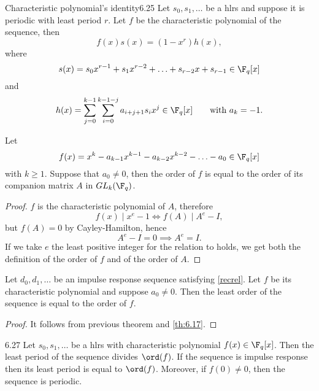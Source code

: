 \begin{teor}{Characteristic polynomial's identity}{6.25}
	Let \(s_0,s_1,\ldots\) be a hlrs and suppose it is periodic with least period \(r\). Let \(f\) be the characteristic polynomial of the sequence, then
	\[
		f(x)s(x) = (1-x^r)h(x),
	\]
	where
	\[
		s(x) = s_0x^{r-1}+s_1x^{r-2}+\ldots+s_{r-2}x+s_{r-1}\in\F_q[x]
	\]
	and
	\[
		h(x) = \sum_{j=0}^{k-1}\sum_{i=0}^{k-1-j}a_{i+j+1}s_i x^j \in \F_q[x] \qquad\text{with }a_k=-1.
	\]
\end{teor}
%
%
\begin{lem}
	Let
	\[
		f(x) = x^k-a_{k-1}x^{k-1}-a_{k-2}x^{k-2}-\ldots-a_0 \in\F_q[x]
	\]
	with \(k\ge 1\). Suppose that \(a_0 \neq 0\), then the order of \(f\) is equal to the order of its companion matrix \(A\) in \(GL_k(\F_q)\).
\end{lem}

\begin{proof}
	\(f\) is the characteristic polynomial of \(A\), therefore
	\[
		f(x) \mid x^e-1 \iff f(A) \mid A^e-I,
	\]
	but \(f(A)=0\) by Cayley-Hamilton, hence
	\[
		A^e-I = 0 \implies A^e = I.
	\]
	If we take \(e\) the least positive integer for the relation to holds, we get both the definition of the order of \(f\) and of the order of \(A\).
\end{proof}

\begin{cor}
	Let \(d_0,d_1,\ldots\) be an impulse response sequence satisfying \eqref{recrel}. Let \(f\) be its characteristic polynomial and suppose \(a_0\neq 0\). Then the least order of the sequence is equal to the order of \(f\).
\end{cor}

\begin{proof}
	It follows from previous theorem and \autoref{th:6.17}.
\end{proof}

\begin{teor}{}{6.27}
	Let \(s_0,s_1,\ldots\) be a hlrs with characteristic polynomial \(f(x)\in\F_q[x]\). Then the least period of the sequence divides \(\ord(f)\). If the sequence is impulse response then its least period is equal to \(\ord(f)\). Moreover, if \(f(0)\neq0\), then the sequence is periodic.
\end{teor}

